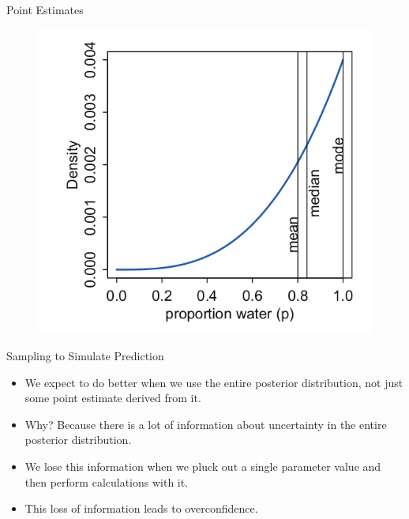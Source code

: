 \documentclass[handout]{beamer}
\begin{document}
\begin{frame}{Point Estimates}
\scriptsize{

   \begin{figure}[h!]
	\centering
	\includegraphics[scale=0.45]{pics/posterior_points.png}
	\end{figure} 




} 

\end{frame}


\begin{frame}{Sampling to Simulate Prediction}
\scriptsize{

\begin{itemize}
\item We expect to do better when we use the entire posterior distribution, not just some point estimate derived from it. 

\item Why? Because there is a lot of information about uncertainty in the entire posterior
distribution. 

\item We lose this information when we pluck out a single parameter value and then
perform calculations with it. 
\item This loss of information leads to overconfidence.
\end{itemize}


} 
\end{frame}
\end{document}
